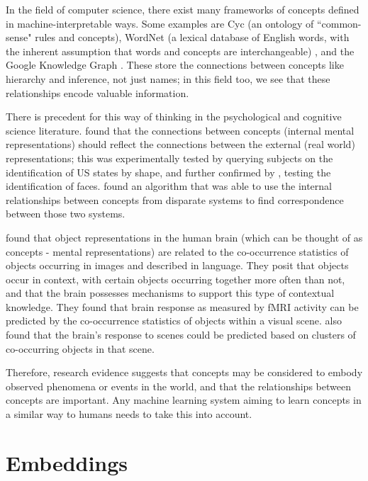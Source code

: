 In the field of computer science, there exist many frameworks of concepts defined in machine-interpretable ways. Some examples are Cyc \cite{Cyc} (an ontology of ``common-sense" rules and concepts), WordNet (a lexical database of English words, with the inherent assumption that words and concepts are interchangeable) \cite{WordNet}, and the Google Knowledge Graph \cite{KnowledgeGraphs}. These store the connections between concepts like hierarchy and inference, not just names; in this field too, we see that these relationships encode valuable information. 

There is precedent for this way of thinking in the psychological and cognitive science literature. \cite{SHEPARD19701} found that the connections between concepts (internal mental representations) should reflect the connections between the external (real world) representations; this was experimentally tested by querying subjects on the identification of US states by shape, and further confirmed by \cite{SecondOrderIsomorphismFaces}, testing the identification of faces. \cite{GOLDSTONE2002295} found an algorithm that was able to use the internal relationships between concepts from disparate systems to find correspondence between those two systems. 

\cite{CoocurrenceVisionLanguage2021} found that object representations in the human brain (which can be thought of as concepts - mental representations) are related to the co-occurrence statistics of objects occurring in images and described in language. They posit that objects occur in context, with certain objects occurring together more often than not, and that the brain possesses mechanisms to support this type of contextual knowledge. They found that brain response as measured by fMRI activity can be predicted by the co-occurrence statistics of objects within a visual scene. \cite{STANSBURY20131025} also found that the brain's response to scenes could be predicted based on clusters of co-occurring objects in that scene. 

Therefore, research evidence suggests that concepts may be considered to embody observed phenomena or events in the world, and that the relationships between concepts are important. Any machine learning system aiming to learn concepts in a similar way to humans needs to take this into account. 

\section{Embeddings}


